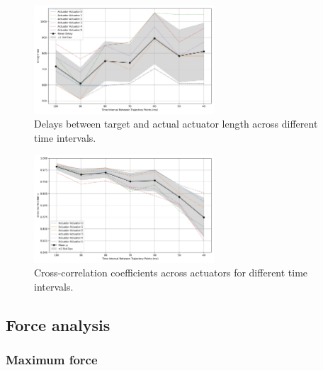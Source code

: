 \begin{figure}[H]
    \centering
    \includegraphics[width=0.6\textwidth]{figures/actuator_delays.png}
    \caption{Delays between target and actual actuator length across different time intervals.}
    \label{fig:actuator_delays_2}
\end{figure}

\begin{figure}[H]
    \centering
    \includegraphics[width=0.6\textwidth]{figures/actuator_rhos.png}
    \caption{Cross-correlation coefficients across actuators for different time intervals.}
    \label{fig:actuator_rhos_2}
\end{figure}

\subsection{Force analysis}

\subsubsection{Maximum force}

